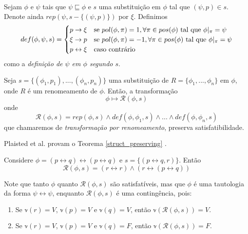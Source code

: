 \begin{definition}
	Sejam $\phi$ e $\psi$ tais que $\psi \sqsubseteq \phi$ e $s$ uma substituição em $\phi$ tal que $(\psi,p) \in s$. Denote ainda $rep(\psi,s-\{(\psi,p)\})$ por $\xi$. Definimos
	\[
	def(\phi,\psi,s) =
	\begin{cases} 
	\hfill p \rightarrow \xi \hfill     & \text{se } pol(\phi,\pi) = 1, \forall \pi \in pos(\phi) \text{ tal que } \phi|_\pi = \psi\\
	\hfill \xi \rightarrow p \hfill     & \text{se } pol(\phi,\pi) = -1, \forall \pi \in pos(\phi) \text{ tal que } \phi|_\pi = \psi\\
	\hfill p \leftrightarrow \xi \hfill & \text{caso contrário}\\
	\end{cases}
	\]
	como a \emph{definição de $\psi$ em $\phi$ segundo $s$}.
\end{definition}

\begin{theorem}
	\label{struct_preserving}
	Seja $s = \{(\phi_1,p_1),...,(\phi_n,p_n) \}$ uma substituição de $R = \{\phi_1,...,\phi_n \}$ em $\phi$, onde $R$ é um renomeamento de $\phi$. Então, a transformação $$\phi \longmapsto \mathcal{R}(\phi,s)$$ onde $$\mathcal{R}(\phi,s) = rep(\phi,s) \wedge def(\phi,\phi_1,s) \wedge ... \wedge def(\phi,\phi_n,s)$$
    que chamaremos de \emph{transformação por renomeamento}, preserva satisfatibilidade.
\end{theorem}

Plaisted et al. provam o Teorema \ref{struct_preserving} \cite{plaisted1986structure}.

\begin{example}
	\label{exemplo_renaming}
    Considere $\phi = (p \leftrightarrow q) \leftrightarrow (p \leftrightarrow q)$ e $s = \{(p \leftrightarrow q, r) \}$. Então $$\mathcal{R}(\phi,s) = (r \leftrightarrow r) \wedge (r \leftrightarrow (p \leftrightarrow q))$$
    
    Note que tanto $\phi$ quanto $\mathcal{R}(\phi,s)$ são satisfatíveis, mas que $\phi$ é uma tautologia da forma $\psi \leftrightarrow \psi$, enquanto $\mathcal{R}(\phi,s)$ é uma contingência, pois:
    \begin{enumerate}
    	\item Se $\mathbb{v}(r) = V$, $\mathbb{v}(p) = V$ e $\mathbb{v}(q) = V$, então $\mathbb{v}(\mathcal{R}(\phi,s)) = V$.
    	\item Se $\mathbb{v}(r) = V$, $\mathbb{v}(p) = V$ e $\mathbb{v}(q) = F$, então $\mathbb{v}(\mathcal{R}(\phi,s)) = F$.
    \end{enumerate}
\end{example}

